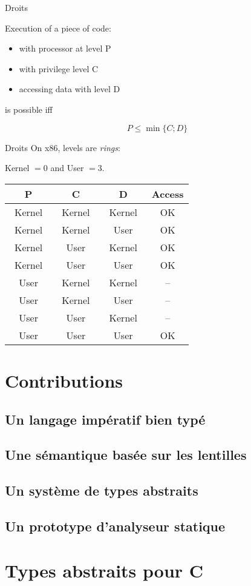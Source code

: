 \documentclass{beamer}
\begin{document}
\begin{frame}{Droits}

Execution of a piece of code:

\begin{itemize}
    \item with processor at level P
    \item with privilege level C
    \item accessing data with level D
\end{itemize}

is possible iff

\[ P ≤ \min\{C; D\} \]

\end{frame}

\begin{frame}{Droits}
On x86, levels are \emph{rings}:

Kernel $= 0$ and User $= 3$.

\begin{center}
\def\modeK{~Kernel~}
\def\modeU{~User~}
\def\accOK{OK}
\def\accNO{--}
\begin{tabular}{cccc}
\toprule
  P
& C
& D
& Access \\
\midrule
  \modeK{} & \modeK{} & \modeK{} & \accOK \\
  \modeK{} & \modeK{} & \modeU{} & \accOK \\
  \modeK{} & \modeU{} & \modeK{} & \accOK \\
  \modeK{} & \modeU{} & \modeU{} & \accOK \\
  \modeU{} & \modeK{} & \modeK{} & \accNO \\
  \modeU{} & \modeK{} & \modeU{} & \accNO \\
  \modeU{} & \modeU{} & \modeK{} & \accNO \\
  \modeU{} & \modeU{} & \modeU{} & \accOK \\
\bottomrule
\end{tabular}
\end{center}

\end{frame}

\section{Contributions}

\subsection{Un langage impératif bien typé}
\subsection{Une sémantique basée sur les lentilles}
\subsection{Un système de types abstraits}
\subsection{Un prototype d'analyseur statique}

\section{Types abstraits pour C}

\end{document}
